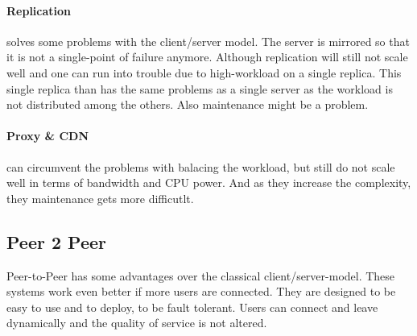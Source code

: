 \paragraph{Replication} %
\label{par:replication}
solves some problems with the client/server model.
The server is mirrored so that it is not a single-point of failure anymore.
Although replication will still not scale well
and one can run into trouble due to high-workload on a single replica.
This single replica than has the same problems as a single server
as the workload is not distributed among the others.
Also maintenance might be a problem.

\paragraph{Proxy \& CDN} %
\label{par:proxy_&_cdn}
can circumvent the problems with balacing the workload,
but still do not scale well in terms of bandwidth and CPU power.
And as they increase the complexity,
they maintenance gets more difficutlt.

\subsection{Peer 2 Peer} %
\label{sub:peer_2_peer}
Peer-to-Peer has some advantages over the classical client/server-model.
These systems work even better if more users are connected.
They are designed to be easy to use and to deploy,
to be fault tolerant.
Users can connect and leave dynamically and the quality of service is not altered.

